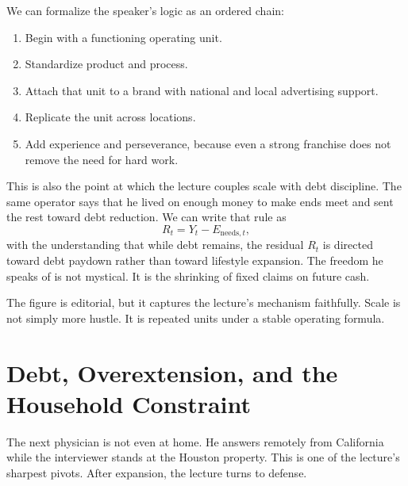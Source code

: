 We can formalize the speaker's logic as an ordered chain:
\begin{enumerate}
\item Begin with a functioning operating unit.
\item Standardize product and process.
\item Attach that unit to a brand with national and local advertising support.
\item Replicate the unit across locations.
\item Add experience and perseverance, because even a strong franchise does not remove the need for hard work.
\end{enumerate}

This is also the point at which the lecture couples scale with debt discipline. The same operator says that he lived on enough money to make ends meet and sent the rest toward debt reduction. We can write that rule as
\begin{equation}
R_t = Y_t - E_{\text{needs},t},
\end{equation}
with the understanding that while debt remains, the residual \(R_t\) is directed toward debt paydown rather than toward lifestyle expansion. The freedom he speaks of is not mystical. It is the shrinking of fixed claims on future cash.

\begin{figure}
\centering
{}
\end{figure}

The figure is editorial, but it captures the lecture's mechanism faithfully. Scale is not simply more hustle. It is repeated units under a stable operating formula.

\section{Debt, Overextension, and the Household Constraint}

The next physician is not even at home. He answers remotely from California while the interviewer stands at the Houston property. This is one of the lecture's sharpest pivots. After expansion, the lecture turns to defense.

